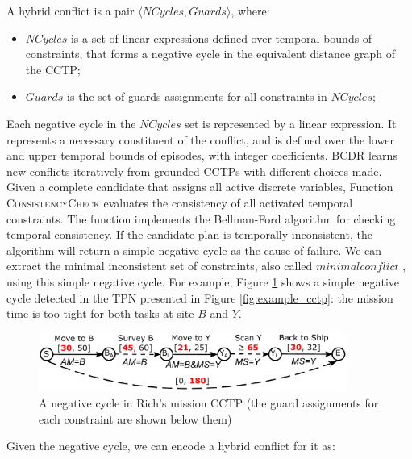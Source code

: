 \documentclass[jair,twoside,11pt,theapa]{article}
\begin{document}
\begin{mydef}
	A hybrid conflict is a pair $\langle NCycles,Guards\rangle$, where:
	\begin{itemize}
		\item $NCycles$ is a set of linear expressions defined over temporal bounds of
		constraints, that forms a negative cycle in the equivalent distance graph of the
		CCTP;
		\item $Guards$ is the set of guards assignments for all constraints in $NCycles$;
	\end{itemize}
\end{mydef}


Each negative cycle in the $NCycles$ set is represented by a linear expression.
It represents a necessary constituent of the conflict, and is defined over the
lower and upper temporal bounds of episodes, with integer coefficients. BCDR
learns new conflicts iteratively from grounded CCTPs with different choices made.
Given a complete candidate that assigns all active discrete variables, Function
\textsc{ConsistencyCheck} evaluates the consistency of all activated temporal
constraints. The function implements the Bellman-Ford algorithm
\cite{bellman1956routing,ford1956network} for checking temporal consistency. If
the candidate plan is temporally inconsistent, the algorithm will return a
simple negative cycle as the cause of failure. We can extract the minimal
inconsistent set of constraints, also called $minimal conflict$
\cite{Liffiton_MUS_2005a}, using this simple negative cycle. For example, Figure
\ref{fig:negative_cycle_consistency} shows a simple negative cycle detected in
the TPN presented in Figure \ref{fig:example_cctp}: the mission time is too
tight for both tasks at site $B$ and $Y$.


\begin{figure}[h!]
	\centering	
	\includegraphics[width=0.9\textwidth]{figures/negative_cycle_consistency.pdf}	
	\caption{A negative cycle in Rich's mission CCTP (the guard assignments for each
		constraint are shown below them)}
	\label{fig:negative_cycle_consistency}
\end{figure}


Given the negative cycle, we can encode a hybrid conflict for it as: \\
\end{document}
